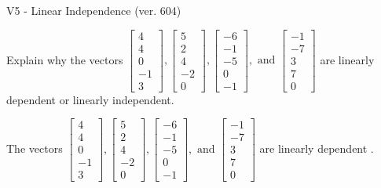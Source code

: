\begin{exercise}
  \begin{exerciseTitle}V5 - Linear Independence (ver. 604)\end{exerciseTitle}
  \begin{exerciseStatement}
    Explain why the vectors \(\left[\begin{array}{r}
4 \\
4 \\
0 \\
-1 \\
3
\end{array}\right] , \left[\begin{array}{r}
5 \\
2 \\
4 \\
-2 \\
0
\end{array}\right] , \left[\begin{array}{r}
-6 \\
-1 \\
-5 \\
0 \\
-1
\end{array}\right] , \text{ and } \left[\begin{array}{r}
-1 \\
-7 \\
3 \\
7 \\
0
\end{array}\right]\) are linearly dependent or linearly independent.	


  \end{exerciseStatement}
  \begin{exerciseAnswer}
   The vectors \(\left[\begin{array}{r}
4 \\
4 \\
0 \\
-1 \\
3
\end{array}\right] , \left[\begin{array}{r}
5 \\
2 \\
4 \\
-2 \\
0
\end{array}\right] , \left[\begin{array}{r}
-6 \\
-1 \\
-5 \\
0 \\
-1
\end{array}\right] , \text{ and } \left[\begin{array}{r}
-1 \\
-7 \\
3 \\
7 \\
0
\end{array}\right]\) are 
  	 linearly dependent  .
  


  \end{exerciseAnswer}
\end{exercise}